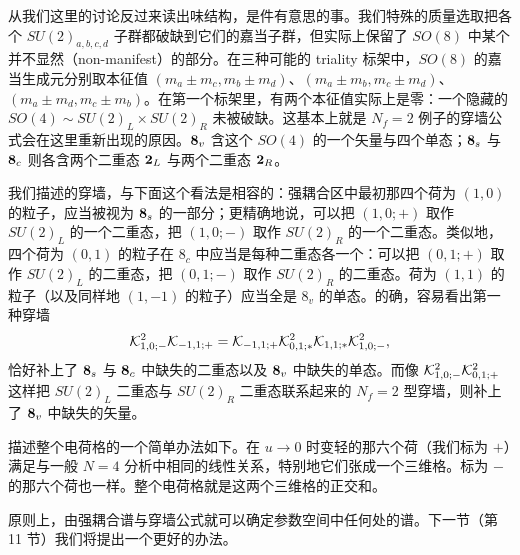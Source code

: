 从我们这里的讨论反过来读出味结构，是件有意思的事。我们特殊的质量选取把各个 $SU(2)_{a,b,c,d}$ 子群都破缺到它们的嘉当子群，但实际上保留了 $SO(8)$ 中某个并不显然（non-manifest）的部分。在三种可能的 triality 标架中，$SO(8)$ 的嘉当生成元分别取本征值 $(m_a \pm m_c, m_b \pm m_d)$、$(m_a \pm m_b, m_c \pm m_d)$、$(m_a \pm m_d, m_c \pm m_b)$。在第一个标架里，有两个本征值实际上是零：一个隐藏的 $SO(4) \sim SU(2)_L \times SU(2)_R$ 未被破缺。这基本上就是 $N_f=2$ 例子的穿墙公式会在这里重新出现的原因。${\bf 8}_v$ 含这个 $SO(4)$ 的一个矢量与四个单态；${\bf 8}_s$ 与 ${\bf 8}_c$ 则各含两个二重态 ${\bf 2}_L$ 与两个二重态 ${\bf 2}_R$。

我们描述的穿墙，与下面这个看法是相容的：强耦合区中最初那四个荷为 $(1,0)$ 的粒子，应当被视为 ${\bf 8}_s$ 的一部分；更精确地说，可以把 $(1,0;+)$ 取作 $SU(2)_L$ 的一个二重态，把 $(1,0;-)$ 取作 $SU(2)_R$ 的一个二重态。类似地，四个荷为 $(0,1)$ 的粒子在 $8_c$ 中应当是每种二重态各一个：可以把 $(0,1;+)$ 取作 $SU(2)_L$ 的二重态，把 $(0,1;-)$ 取作 $SU(2)_R$ 的二重态。荷为 $(1,1)$ 的粒子（以及同样地 $(1,-1)$ 的粒子）应当全是 $8_v$ 的单态。的确，容易看出第一种穿墙
\begin{equation}
\mathcal{K}_{1,0;-}^2 \mathcal{K}_{-1,1;+}=\mathcal{K}_{-1,1;+}\mathcal{K}_{0,1;*}^2\mathcal{K}_{1,1;*}\mathcal{K}_{1,0;-}^2,
\end{equation}
恰好补上了 ${\bf 8}_s$ 与 ${\bf 8}_c$ 中缺失的二重态以及 ${\bf 8}_v$ 中缺失的单态。而像 $\mathcal{K}_{1,0;-}^2 \mathcal{K}_{0,1;+}^2$ 这样把 $SU(2)_L$ 二重态与 $SU(2)_R$ 二重态联系起来的 $N_f=2$ 型穿墙，则补上了 ${\bf 8}_v$ 中缺失的矢量。

描述整个电荷格的一个简单办法如下。在 $u\to 0$ 时变轻的那六个荷（我们标为 $+$）满足与一般 $N=4$ 分析中相同的线性关系，特别地它们张成一个三维格。标为 $-$ 的那六个荷也一样。整个电荷格就是这两个三维格的正交和。

原则上，由强耦合谱与穿墙公式就可以确定参数空间中任何处的谱。下一节（第 11 节）我们将提出一个更好的办法。
